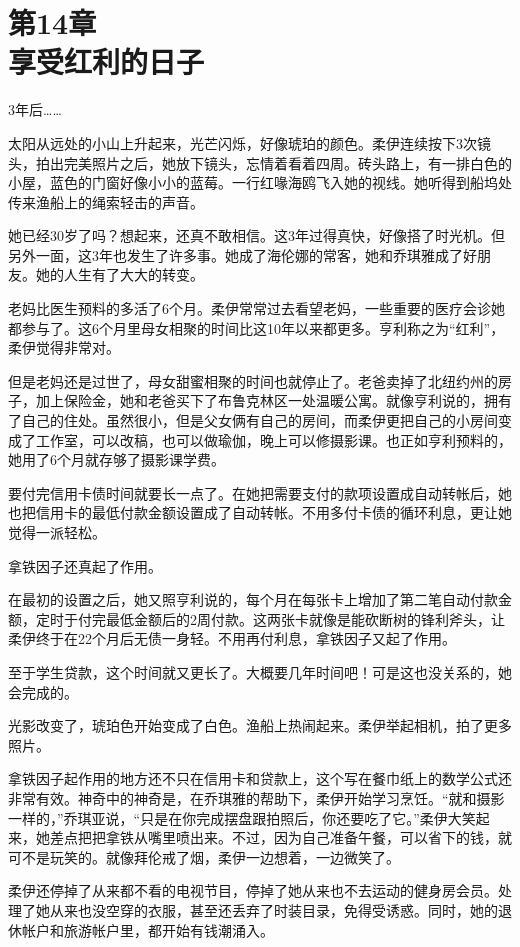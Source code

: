 \section[第14章\q 享受红利的日子]{第14章\\ 享受红利的日子}
\label{sec:ch14}

3年后……

太阳从远处的小山上升起来，光芒闪烁，好像琥珀的颜色。柔伊连续按下3次镜头，拍出完美照片之后，她放下镜头，忘情着看着四周。砖头路上，有一排白色的小屋，蓝色的门窗好像小小的蓝莓。一行红喙海鸥飞入她的视线。她听得到船坞处传来渔船上的绳索轻击的声音。

她已经30岁了吗？想起来，还真不敢相信。这3年过得真快，好像搭了时光机。但另外一面，这3年也发生了许多事。她成了海伦娜的常客，她和乔琪雅成了好朋友。她的人生有了大大的转变。

老妈比医生预料的多活了6个月。柔伊常常过去看望老妈，一些重要的医疗会诊她都参与了。这6个月里母女相聚的时间比这10年以来都更多。亨利称之为“红利”，柔伊觉得非常对。

但是老妈还是过世了，母女甜蜜相聚的时间也就停止了。老爸卖掉了北纽约州的房子，加上保险金，她和老爸买下了布鲁克林区一处温暖公寓。就像亨利说的，拥有了自己的住处。虽然很小，但是父女俩有自己的房间，而柔伊更把自己的小房间变成了工作室，可以改稿，也可以做瑜伽，晚上可以修摄影课。也正如亨利预料的，她用了6个月就存够了摄影课学费。

要付完信用卡债时间就要长一点了。在她把需要支付的款项设置成自动转帐后，她也把信用卡的最低付款金额设置成了自动转帐。不用多付卡债的循环利息，更让她觉得一派轻松。

拿铁因子还真起了作用。

在最初的设置之后，她又照亨利说的，每个月在每张卡上增加了第二笔自动付款金额，定时于付完最低金额后的2周付款。这两张卡就像是能砍断树的锋利斧头，让柔伊终于在22个月后无债一身轻。不用再付利息，拿铁因子又起了作用。

至于学生贷款，这个时间就又更长了。大概要几年时间吧！可是这也没关系的，她会完成的。

光影改变了，琥珀色开始变成了白色。渔船上热闹起来。柔伊举起相机，拍了更多照片。

拿铁因子起作用的地方还不只在信用卡和贷款上，这个写在餐巾纸上的数学公式还非常有效。神奇中的神奇是，在乔琪雅的帮助下，柔伊开始学习烹饪。“就和摄影一样的，”乔琪亚说，“只是在你完成摆盘跟拍照后，你还要吃了它。”柔伊大笑起来，她差点把把拿铁从嘴里喷出来。不过，因为自己准备午餐，可以省下的钱，就可不是玩笑的。就像拜伦戒了烟，柔伊一边想着，一边微笑了。

柔伊还停掉了从来都不看的电视节目，停掉了她从来也不去运动的健身房会员。处理了她从来也没空穿的衣服，甚至还丢弃了时装目录，免得受诱惑。同时，她的退休帐户和旅游帐户里，都开始有钱潮涌入。

